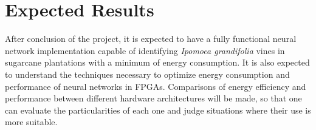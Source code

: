 \documentclass[
	12pt,				%
	oneside,			%
	a4paper,			%
	brazil,			    %
	french,				%
	spanish,			%
	english,			%
	]{abntex2}
\begin{document}
\chapter{Expected Results}


  After conclusion of the project, it is expected to have a fully functional neural network implementation capable of identifying \textit{Ipomoea grandifolia} vines in sugarcane plantations with a minimum of energy consumption. It is also expected to understand the techniques necessary to optimize energy consumption and performance of neural networks in FPGAs. Comparisons of energy efficiency and performance between different hardware architectures will be made, so that one can evaluate the particularities of each one and judge situations where their use is more suitable.
\postextual


%
\printbibliography

\end{document}

